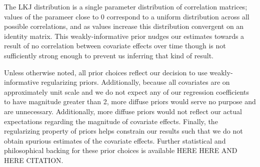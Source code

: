 \documentclass[12pt,letterpaper]{article}
\begin{document}
The LKJ distribution is a single parameter distribution of correlation matrices; values of the parameer close to 0 correspond to a uniform distribution across all possible correlations, and as values increase this distribution convergent on an identity matrix. This weakly-informative prior nudges our estimates towards a result of no correlation between covariate effects over time though is not sufficiently strong enough to prevent us inferring that kind of result.

Unless otherwise noted, all prior choices reflect our decision to use weakly-informative regularizing priors. Additionally, because all covariates are on approximately unit scale and we do not expect any of our regression coefficients to have magnitude greater than 2, more diffuse priors would serve no purpose and are unnecessary. Additionally, more diffuse priors would not reflect our actual expectations regarding the magnitude of covariate effects. Finally, the regularizing property of priors helps constrain our results such that we do not obtain spurious estimates of the covariate effects. Further statistical and philosophical backing for these prior choices is available HERE HERE AND HERE CITATION.
\end{document}
